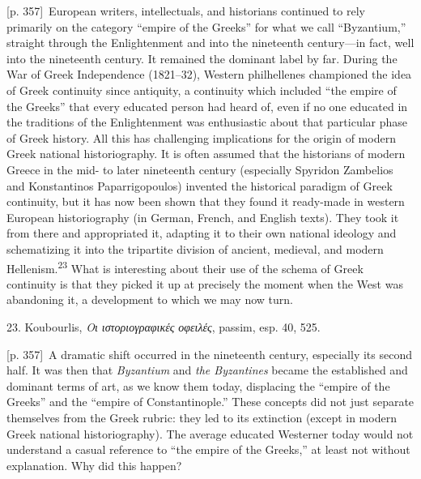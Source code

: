 \documentclass[10pt,a4paper]{article}
\begin{document}
{\scriptsize\color{gray}[p. 357]}\ European writers, intellectuals, and historians continued to rely primarily on the category “empire of the Greeks” for what we call “Byzantium,” straight through the Enlightenment and into the nineteenth century—in fact, well into the nineteenth century. It remained the dominant label by far. During the War of Greek Independence (1821–32), Western philhellenes championed the idea of Greek continuity since antiquity, a continuity which included “the empire of the Greeks” that every educated person had heard of, even if no one educated in the traditions of the Enlightenment was enthusiastic about that particular phase of Greek history. All this has challenging implications for the origin of modern Greek national historiography. It is often assumed that the historians of modern Greece in the mid- to later nineteenth century (especially Spyridon Zambelios and Konstantinos Paparrigopoulos) invented the historical paradigm of Greek continuity, but it has now been shown that they found it ready-made in western European historiography (in German, French, and English texts). They took it from there and appropriated it, adapting it to their own national ideology and schematizing it into the tripartite division of ancient, medieval, and modern Hellenism.\nobreak\textsuperscript{23} What is interesting about their use of the schema of Greek continuity is that they picked it up at precisely the moment when the West was abandoning it, a development to which we may now turn.\par{\small 23. Koubourlis, \textit{Οι ιστοριογραφικές οφειλές}, passim, esp. 40, 525.\par}
{\scriptsize\color{gray}[p. 357]}\ A dramatic shift occurred in the nineteenth century, especially its second half. It was then that \textit{Byzantium} and \textit{the Byzantines} became the established and dominant terms of art, as we know them today, displacing the “empire of the Greeks” and the “empire of Constantinople.” These concepts did not just separate themselves from the Greek rubric: they led to its extinction (except in modern Greek national historiography). The average educated Westerner today would not understand a casual reference to “the empire of the Greeks,” at least not without explanation. Why did this happen?\par
\end{document}
